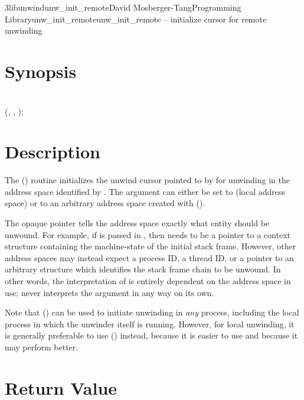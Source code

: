 \documentclass{article}
\begin{document}
\begin{Name}{3libunwind}{unw\_init\_remote}{David Mosberger-Tang}{Programming Library}{unw\_init\_remote}unw\_init\_remote -- initialize cursor for remote unwinding
\end{Name}

\section{Synopsis}

\\

 (, , );\\

\section{Description}

The () routine initializes the unwind cursor
pointed to by  for unwinding in the address space identified by
.  The  argument can either be set to
 (local address space) or to an arbitrary
address space created with ().

The  opaque pointer tells the address space exactly what entity
should be unwound.  For example, if  is
passed in , then  needs to be a pointer to a context
structure containing the machine-state of the initial stack frame.
However, other address spaces may instead expect a process ID, a
thread ID, or a pointer to an arbitrary structure which identifies the
stack frame chain to be unwound.  In other words, the interpretation
of  is entirely dependent on the address space in use;
 never interprets the argument in any way on its own.

Note that () can be used to initiate unwinding
in \emph{any} process, including the local process in which the
unwinder itself is running.  However, for local unwinding, it is
generally preferable to use () instead, because
it is easier to use and because it may perform better.

\section{Return Value}
\end{document}
